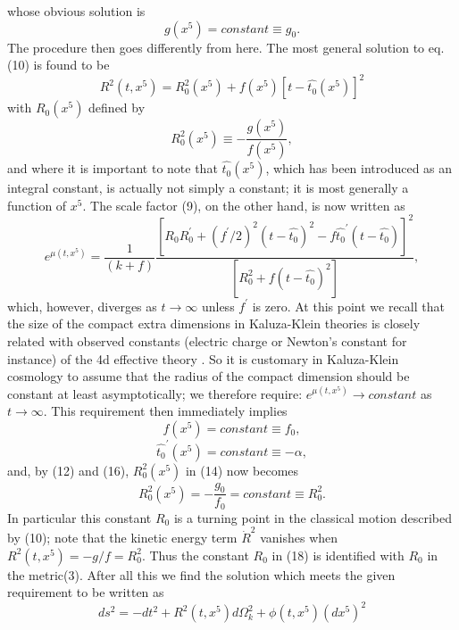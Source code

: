 \documentclass[a4paper,12pt]{article}
\begin{document}
whose obvious solution is
\begin{equation}
g(x^5)=constant \equiv g_0 .
\end{equation}
The procedure then goes differently from here. The most general
solution to eq.(10) is found to be
\begin{equation}
R^2(t, x^5) = R^2_0(x^5) + f(x^5)[t-\hat{t_0}(x^5) ]^2
\end{equation}
with $R_0(x^5)$ defined by
\begin{equation}
 R_0^2(x^5) \equiv -\frac{g(x^5)}{f(x^5)}  ,
 \end{equation}
 and where it is important to note that $\hat{t_0}(x^5)$, which
 has been introduced as an integral constant, is actually not
 simply a constant; it is most generally a function of $x^5$. The
 scale factor (9), on the other hand, is now written as
 \begin{equation}
 e^{\mu(t,x^5)} = \frac{1}{(k+f)}\frac{[R_0R_0^{\prime}
 +(f^{\prime}/2)^2 (t-\hat{t_0})^2
 -f\hat{t_0}^{\prime}(t-\hat{t_0})]^2}{[R^2_0 +f(t-\hat{t_0})^2]}
 ,
 \end{equation}
which, however, diverges as $t\rightarrow \infty$ unless
$f^{\prime}$ is zero. At this point we recall that the size of the
compact extra dimensions in Kaluza-Klein theories is closely
related with observed constants (electric charge or Newton's
constant for instance) of the 4d effective theory \cite{gro}. So
it is customary in Kaluza-Klein cosmology to assume that the
radius of the compact dimension should be constant at least
asymptotically; we therefore require: $e^{\mu(t,x^5)} \rightarrow
constant$ as $ t \rightarrow \infty$. This requirement then
immediately implies
\begin{equation}
f(x^5) = constant \equiv f_0  ,
\end{equation}
\begin{equation}
\hat{t_0}^{\prime}(x^5) = constant \equiv -\alpha ,
\end{equation}
and, by (12) and (16), $R^2_0(x^5)$ in (14) now becomes
\begin{equation}
R^2_0(x^5) = -\frac{g_0}{f_0} =constant \equiv R^2_0  .
\end{equation}
In particular this constant $R_0$ is a turning point in the
classical motion described by (10); note that the kinetic energy
term $\dot{R}^2$ vanishes when $R^2(t,x^5) =-g/f=R^2_0$. Thus the
constant $R_0$ in (18) is identified with $R_0$ in the metric(3).
After all this we find the solution which meets the given
requirement to be written as
\begin{equation}
ds^2=-dt^2 + R^2(t,x^5)d\Omega^2_k + \phi(t,x^5) (dx^5)^2
\end{equation}
\end{document}

